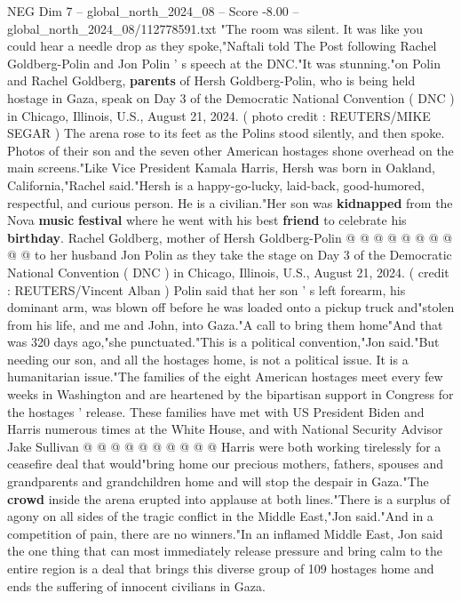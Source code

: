 \begin{textsample}{NEG Dim 7 – global\_north\_2024\_08 – Score -8.00 – global\_north\_2024\_08/112778591.txt}  \label{ex:f7_neg_085}
"The room was silent.
It was like you could hear a needle drop as they spoke,"Naftali told The Post following Rachel Goldberg-Polin and Jon Polin ' s speech at the DNC."It was stunning."on Polin and Rachel Goldberg, \textbf{parents} of Hersh Goldberg-Polin, who is being held hostage in Gaza, speak on Day 3 of the Democratic National Convention ( DNC ) in Chicago, Illinois, U.S., August 21, 2024. ( photo credit : REUTERS/MIKE SEGAR ) The arena rose to its feet as the Polins stood silently, and then spoke.
Photos of their son and the seven other American hostages shone overhead on the main screens."Like Vice President Kamala Harris, Hersh was born in Oakland, California,"Rachel said."Hersh is a happy-go-lucky, laid-back, good-humored, respectful, and curious person.
He is a civilian."Her son was \textbf{kidnapped} from the Nova \textbf{music} \textbf{festival} where he went with his best \textbf{friend} to celebrate his \textbf{birthday}.
Rachel Goldberg, mother of Hersh Goldberg-Polin @ @ @ @ @ @ @ @ @ @ to her husband Jon Polin as they take the stage on Day 3 of the Democratic National Convention ( DNC ) in Chicago, Illinois, U.S., August 21, 2024. ( credit : REUTERS/Vincent Alban ) Polin said that her son ' s left forearm, his dominant arm, was blown off before he was loaded onto a pickup truck and"stolen from his life, and me and John, into Gaza."A call to bring them home"And that was 320 days ago,"she punctuated."This is a political convention,"Jon said."But needing our son, and all the hostages home, is not a political issue.
It is a humanitarian issue."The families of the eight American hostages meet every few weeks in Washington and are heartened by the bipartisan support in Congress for the hostages ' release.
These families have met with US President Biden and Harris numerous times at the White House, and with National Security Advisor Jake Sullivan @ @ @ @ @ @ @ @ @ @ Harris were both working tirelessly for a ceasefire deal that would"bring home our precious mothers, fathers, spouses and grandparents and grandchildren home and will stop the despair in Gaza."The \textbf{crowd} inside the arena erupted into applause at both lines."There is a surplus of agony on all sides of the tragic conflict in the Middle East,"Jon said."And in a competition of pain, there are no winners."In an inflamed Middle East, Jon said the one thing that can most immediately release pressure and bring calm to the entire region is a deal that brings this diverse group of 109 hostages home and ends the suffering of innocent civilians in Gaza.

\end{textsample}
